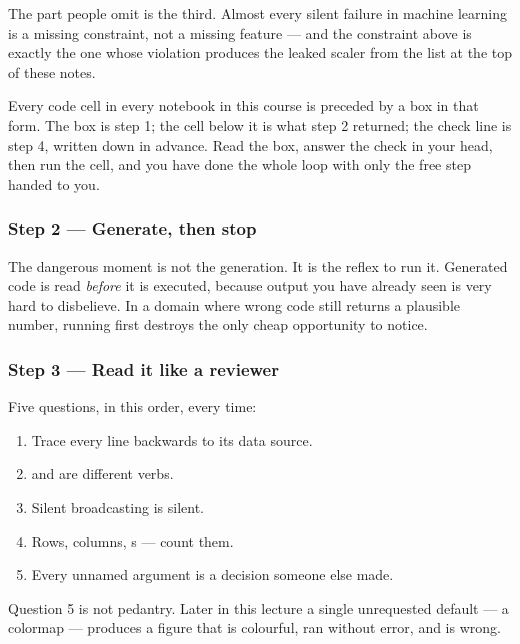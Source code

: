 \documentclass[11pt,a4paper]{article}
\begin{document}
The part people omit is the third. Almost every silent failure in machine
learning is a missing constraint, not a missing feature --- and the constraint
above is exactly the one whose violation produces the leaked scaler from the
list at the top of these notes.

Every code cell in every notebook in this course is preceded by a box in that
form. The box is step 1; the cell below it is what step 2 returned; the check
line is step 4, written down in advance. Read the box, answer the check in your
head, then run the cell, and you have done the whole loop with only the free
step handed to you.

\subsubsection{Step 2 --- Generate, then stop}

The dangerous moment is not the generation. It is the reflex to run it.
Generated code is read \emph{before} it is executed, because output you have
already seen is very hard to disbelieve. In a domain where wrong code still
returns a plausible number, running first destroys the only cheap opportunity
to notice.

\subsubsection{Step 3 --- Read it like a reviewer}

Five questions, in this order, every time:

\begin{enumerate}[leftmargin=1.6em,itemsep=2pt]
  \item {} Trace every line backwards to its
        data source.
  \item {}  and 
        are different verbs.
  \item {} Silent broadcasting is silent.
  \item {} Rows, columns, s --- count them.
  \item {} Every unnamed argument
        is a decision someone else made.
\end{enumerate}

Question 5 is not pedantry. Later in this lecture a single unrequested default
--- a colormap --- produces a figure that is colourful, ran without error, and
is wrong.
\end{document}
